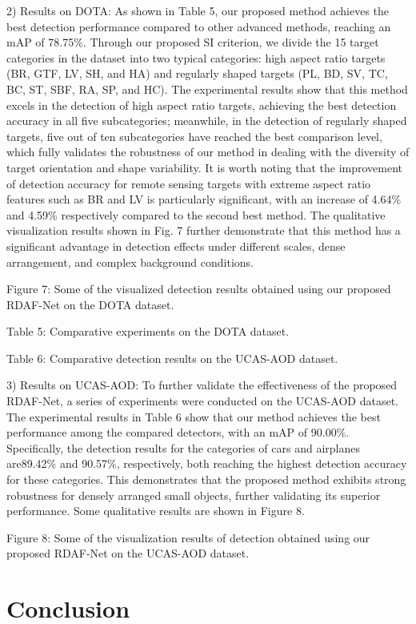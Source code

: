 \documentclass[journal]{IEEEtran}
\begin{document}
2) Results on DOTA: As shown in Table 5, our proposed method achieves the best detection performance compared to other advanced methods, reaching an mAP of 78.75\%. Through our proposed SI criterion, we divide the 15 target categories in the dataset into two typical categories: high aspect ratio targets (BR, GTF, LV, SH, and HA) and regularly shaped targets (PL, BD, SV, TC, BC, ST, SBF, RA, SP, and HC). The experimental results show that this method excels in the detection of high aspect ratio targets, achieving the best detection accuracy in all five subcategories; meanwhile, in the detection of regularly shaped targets, five out of ten subcategories have reached the best comparison level, which fully validates the robustness of our method in dealing with the diversity of target orientation and shape variability. It is worth noting that the improvement of detection accuracy for remote sensing targets with extreme aspect ratio features such as BR and LV is particularly significant, with an increase of 4.64\% and 4.59\% respectively compared to the second best method. The qualitative visualization results shown in Fig. 7 further demonstrate that this method has a significant advantage in detection effects under different scales, dense arrangement, and complex background conditions.

Figure 7: Some of the visualized detection results obtained using our proposed RDAF-Net on the DOTA dataset.

Table 5: Comparative experiments on the DOTA dataset.

Table 6: Comparative detection results on the UCAS-AOD dataset.

3) Results on UCAS-AOD: To further validate the effectiveness of the proposed RDAF-Net, a series of experiments were conducted on the UCAS-AOD dataset. The experimental results in Table 6 show that our method achieves the best performance among the compared detectors, with an mAP of 90.00\%. Specifically, the detection results for the categories of cars and airplanes are89.42\% and 90.57\%, respectively, both reaching the highest detection accuracy for these categories. This demonstrates that the proposed method exhibits strong robustness for densely arranged small objects, further validating its superior performance. Some qualitative results are shown in Figure 8.

Figure 8: Some of the visualization results of detection obtained using our proposed RDAF-Net on the UCAS-AOD dataset.

\section{ Conclusion }
\end{document}
